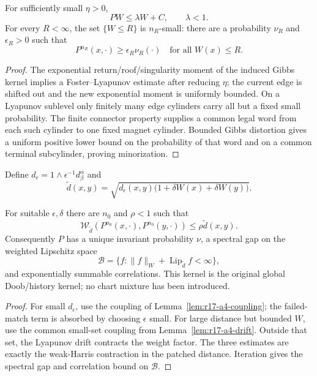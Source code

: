 \begin{lemma}
\label{lem:r17-a4-drift}
For sufficiently small \(\eta>0\),
\[
 PW\le\lambda W+C,
 \qquad \lambda<1.
\]
For every \(R<\infty\), the set \(\{W\le R\}\) is \(n_R\)-small: there are a
probability \(\nu_R\) and \(\epsilon_R>0\) such that
\[
 P^{n_R}(x,\cdot)\ge\epsilon_R\nu_R(\cdot)
 \quad\text{for all }W(x)\le R.
\]
\end{lemma}

\begin{proof}
The exponential return/roof/singularity moment of the induced Gibbs kernel
implies a Foster--Lyapunov estimate after reducing \(\eta\); the current edge
is shifted out and the new exponential moment is uniformly bounded.  On a
Lyapunov sublevel only finitely many edge cylinders carry all but a fixed
small probability.  The finite connector property supplies a common legal
word from each such cylinder to one fixed magnet cylinder.  Bounded Gibbs
distortion gives a uniform positive lower bound on the probability of that
word and on a common terminal subcylinder, proving minorization.
\end{proof}

Define \(d_\epsilon=1\wedge\epsilon^{-1}d_\beta^\alpha\) and
\[
 \widetilde d(x,y)=
 \sqrt{d_\epsilon(x,y)
       \bigl(1+\delta W(x)+\delta W(y)\bigr)}.
\]

\begin{theorem}
\label{thm:r17-a4-harris}
For suitable \(\epsilon,\delta\) there are \(n_0\) and \(\rho<1\) such that
\[
 \mathcal W_{\widetilde d}(P^{n_0}(x,\cdot),P^{n_0}(y,\cdot))
 \le\rho\widetilde d(x,y).
\]
Consequently \(P\) has a unique invariant probability \(\nu\), a spectral gap
on the weighted Lipschitz space
\[
 \mathcal B=\{f:\|f\|_W+\operatorname{Lip}_{\widetilde d}f<\infty\},
\]
and exponentially summable correlations.  This kernel is the original global
Doob/history kernel; no chart mixture has been introduced.
\end{theorem}

\begin{proof}
For small \(d_\epsilon\), use the coupling of
Lemma~\ref{lem:r17-a4-coupling}; the failed-match term is absorbed by choosing
\(\epsilon\) small.  For large distance but bounded \(W\), use the common
small-set coupling from Lemma~\ref{lem:r17-a4-drift}.  Outside that set, the
Lyapunov drift contracts the weight factor.  The three estimates are exactly
the weak-Harris contraction in the patched distance.  Iteration gives the
spectral gap and correlation bound on \(\mathcal B\).
\end{proof}

